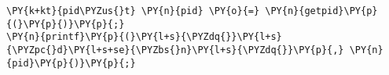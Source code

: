 \begin{Verbatim}[commandchars=\\\{\}]
\PY{k+kt}{pid\PYZus{}t} \PY{n}{pid} \PY{o}{=} \PY{n}{getpid}\PY{p}{(}\PY{p}{)}\PY{p}{;}
\PY{n}{printf}\PY{p}{(}\PY{l+s}{\PYZdq{}}\PY{l+s}{\PYZpc{}d}\PY{l+s+se}{\PYZbs{}n}\PY{l+s}{\PYZdq{}}\PY{p}{,} \PY{n}{pid}\PY{p}{)}\PY{p}{;}
\end{Verbatim}
